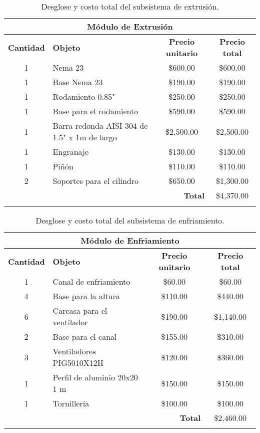 \documentclass[14pt,oneside]{extarticle} %
\begin{document}
\newpage

\begin{longtable}{|c|l|c|c|}
\hline
\multicolumn{4}{|c|}{\textbf{Módulo de Extrusión}} \\ \hline
\textbf{\centering Cantidad} & \textbf{\centering Objeto} & \textbf{\centering Precio unitario} & \textbf{\centering Precio total} \\ \hline
1 & Nema 23 & \$600.00 & \$600.00 \\ \hline
1 & Base Nema 23 & \$190.00 & \$190.00 \\ \hline
1 & Rodamiento 0.85" & \$250.00 & \$250.00 \\ \hline
1 & Base para el rodamiento & \$590.00 & \$590.00 \\ \hline
1 & Barra redonda AISI 304 de 1.5" x 1m de largo & \$2,500.00 & \$2,500.00 \\ \hline
1 & Engranaje & \$130.00 & \$130.00 \\ \hline
1 & Piñón & \$110.00 & \$110.00 \\ \hline
2 & Soportes para el cilindro & \$650.00 & \$1,300.00 \\ \hline
\multicolumn{3}{|r|}{\textbf{Total}} & \$4,370.00 \\ \hline
\caption{Desglose y costo total del subsistema de extrusión.}
\end{longtable}

\begin{longtable}{|c|l|c|c|}
\hline
\multicolumn{4}{|c|}{\textbf{Módulo de Enfriamiento}} \\ \hline
\textbf{\centering Cantidad} & \textbf{\centering Objeto} & \textbf{\centering Precio unitario} & \textbf{\centering Precio total} \\ \hline
1 & Canal de enfriamiento & \$60.00 & \$60.00 \\ \hline
4 & Base para la altura & \$110.00 & \$440.00 \\ \hline
6 & Carcasa para el ventilador & \$190.00 & \$1,140.00 \\ \hline
2 & Base para el canal & \$155.00 & \$310.00 \\ \hline
3 & Ventiladores PIG5010X12H & \$120.00 & \$360.00 \\ \hline
1 & Perfil de aluminio 20x20 1 m & \$150.00 & \$150.00 \\ \hline
1 & Tornillería & \$100.00 & \$100.00 \\ \hline
\multicolumn{3}{|r|}{\textbf{Total}} & \$2,460.00 \\ \hline
\caption{Desglose y costo total del subsistema de enfriamiento.}
\end{longtable}
\end{document}

